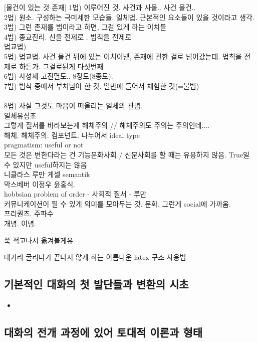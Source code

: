 \documentclass[12pt, a4paper]{article}
\begin{document}
[물건이 있는 것 존재]
1법) 이루어진 것. 사건과 사물.. 사건 물건.. \\
2법) 원소. 구성하는 극미세한 모습들. 일체법. 근본적인 요소들이 있을 것이라고 생각.\\
3법) 그런 존재를 법이라고 하면, 그걸 있게 하는 이치들\\
4법) 종교진리. 신을 전제로 . 법칙을 전제로\\
법교법) \\
5법) 법교법. 사건 물건 뒤에 있는 이치이넫, 존재에 관한 걸로 넘어갔는데. 법칙을 전제로 하든가. 그걸로된게 다섯번째\\
6법) 사성재 고진멸도.. 8정도(8종도). \\
7법) 법칙 중에서 부처님이 한 것. 열반에 들어서 체험한 것(=불법)\\
[우리가 아는 것이 마음에 다 있다]\\
8법) 사실 그것도 마음이 떠올리는 일체의 관념. \\
일체유심조\\
그렇게 질서를 바라보는게 해체주의 // 해체주의도 주의는 주의인데.... \\
해체. 해체주의. 컴포넌트. 나누어서 ideal type\\
pragmatism: useful or not\\
모든 것은 변한다라는 건 기능분화사회 / 신분사회를 할 때는 유용하지 않음. True일 수 있지만 useful하지는 않음\\
니클라스 루만 게셀 semantik\\
막스베버 이정우 윤홍식.\\
hobbsian problem of order - 사회적 질서 - 루만\\
커뮤니케이션이 될 수 있게 의미를 모아두는 것. 문화. 그런게 social에 가까움.\\

프리퀀츠. 주파수 \\
개념. 이념. 

쭉 적고나서 옮겨볼게유

대가리 굴리다가 끝나지 않게 하는 아름다운 latex 구조 사용법 ~

\subsection{기본적인 대화의 첫 발단들과 변환의 시초}
\begin{itemize}
    \item 
\end{itemize}

\subsection{대화의 전개 과정에 있어 토대적 이론과 형태}
\end{document}
